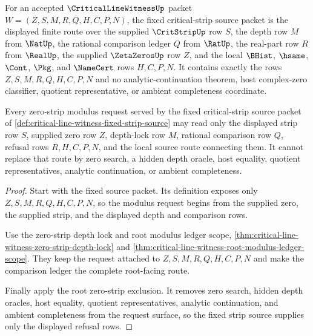 \begin{definition}
\label{def:critical-line-witness-fixed-strip-source}
For an accepted $\CriticalLineWitnessUp$ packet $W=(Z,S,M,R,Q,H,C,P,N)$, the fixed critical-strip source packet is the displayed finite route over the supplied $\CritStripUp$ row $S$, the depth row $M$ from $\NatUp$, the rational comparison ledger $Q$ from $\RatUp$, the real-part row $R$ from $\RealUp$, the supplied $\ZetaZerosUp$ row $Z$, and the local $\BHist$, $\hsame$, $\Cont$, $\Pkg$, and $\NameCert$ rows $H,C,P,N$. It contains exactly the rows $Z,S,M,R,Q,H,C,P,N$ and no analytic-continuation theorem, host complex-zero classifier, quotient representative, or ambient completeness coordinate.
\end{definition}

\begin{theorem}
\label{thm:critical-line-witness-fixed-strip-modulus-refusal}
Every zero-strip modulus request served by the fixed critical-strip source packet of \autoref{def:critical-line-witness-fixed-strip-source} may read only the displayed strip row $S$, supplied zero row $Z$, depth-lock row $M$, rational comparison row $Q$, refusal rows $R,H,C,P,N$, and the local source route connecting them. It cannot replace that route by zero search, a hidden depth oracle, host equality, quotient representatives, analytic continuation, or ambient completeness.
\end{theorem}
\begin{proof}
Start with the fixed source packet. Its definition exposes only $Z,S,M,R,Q,H,C,P,N$, so the modulus request begins from the supplied zero, the supplied strip, and the displayed depth and comparison rows.

Use the zero-strip depth lock and root modulus ledger scope, \autoref{thm:critical-line-witness-zero-strip-depth-lock} and \autoref{thm:critical-line-witness-root-modulus-ledger-scope}. They keep the request attached to $Z,S,M,R,Q,H,C,P,N$ and make the comparison ledger the complete root-facing route.

Finally apply the root zero-strip exclusion. It removes zero search, hidden depth oracles, host equality, quotient representatives, analytic continuation, and ambient completeness from the request surface, so the fixed strip source supplies only the displayed refusal rows.
\end{proof}

